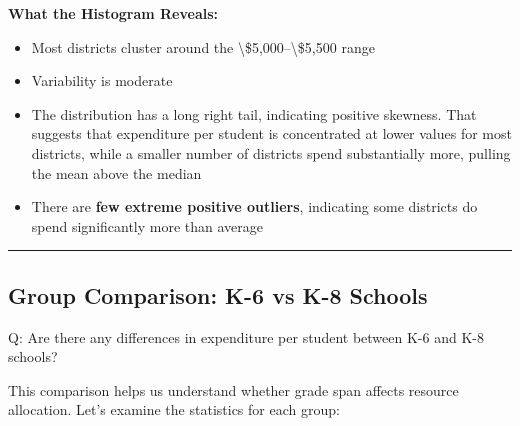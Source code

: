 \documentclass[
  12pt,
  letterpaper,
]{scrbook}
\newenvironment{Shaded}{\begin{snugshade}}{\end{snugshade}}
\newcommand{\AttributeTok}[1]{\textcolor[rgb]{0.40,0.45,0.13}{#1}}
\newcommand{\CommentTok}[1]{\textcolor[rgb]{0.37,0.37,0.37}{#1}}
\newcommand{\ConstantTok}[1]{\textcolor[rgb]{0.56,0.35,0.01}{#1}}
\newcommand{\FunctionTok}[1]{\textcolor[rgb]{0.28,0.35,0.67}{#1}}
\newcommand{\NormalTok}[1]{\textcolor[rgb]{0.00,0.23,0.31}{#1}}
\newcommand{\OtherTok}[1]{\textcolor[rgb]{0.00,0.23,0.31}{#1}}
\newcommand{\SpecialCharTok}[1]{\textcolor[rgb]{0.37,0.37,0.37}{#1}}
\providecommand{\tightlist}{%
  \setlength{\itemsep}{0pt}\setlength{\parskip}{0pt}}
\renewcommand{\tightlist}{\setlength{\itemsep}{0.5\baselineskip}\setlength{\parskip}{0.2\baselineskip}}
\theoremstyle{definition}
\theoremstyle{plain}
\theoremstyle{remark}
\begin{document}
\textbf{What the Histogram Reveals:}

\begin{itemize}
\tightlist
\item
  Most districts cluster around the
  \textbackslash\$5,000--\textbackslash\$5,500 range
\item
  Variability is moderate
\item
  The distribution has a long right tail, indicating positive skewness.
  That suggests that expenditure per student is concentrated at lower
  values for most districts, while a smaller number of districts spend
  substantially more, pulling the mean above the median
\item
  There are \textbf{few extreme positive outliers}, indicating some
  districts do spend significantly more than average
\end{itemize}

\begin{center}\rule{0.5\linewidth}{0.5pt}\end{center}

\subsection{Group Comparison: K-6 vs K-8
Schools}\label{group-comparison-k-6-vs-k-8-schools}

Q: Are there any differences in expenditure per student between K-6 and
K-8 schools?

This comparison helps us understand whether grade span affects resource
allocation. Let's examine the statistics for each group:

\begin{Shaded}
\end{Shaded}
\end{document}
